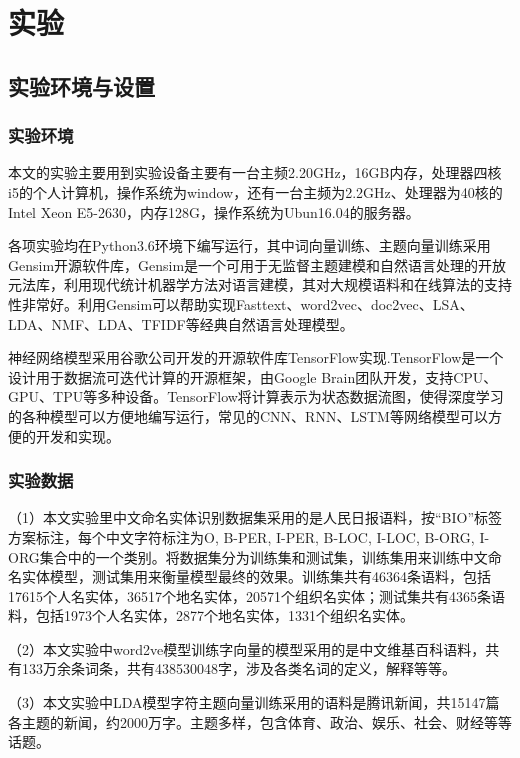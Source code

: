 \documentclass[winfonts,master,oneside,nobackinfo]{njuthesis}
\begin{document}
\section{实验}

\subsection{实验环境与设置}

\subsubsection{实验环境}

本文的实验主要用到实验设备主要有一台主频2.20GHz，16GB内存，处理器四核i5的个人计算机，操作系统为window，还有一台主频为2.2GHz、处理器为40核的Intel Xeon E5-2630，内存128G，操作系统为Ubun16.04的服务器。

各项实验均在Python3.6环境下编写运行，其中词向量训练、主题向量训练采用Gensim开源软件库，Gensim是一个可用于无监督主题建模和自然语言处理的开放元法库，利用现代统计机器学方法对语言建模，其对大规模语料和在线算法的支持性非常好。利用Gensim可以帮助实现Fasttext、word2vec、doc2vec、LSA、LDA、NMF、LDA、TFIDF等经典自然语言处理模型。

神经网络模型采用谷歌公司开发的开源软件库TensorFlow\cite{TensorFlow}实现.TensorFlow是一个设计用于数据流可迭代计算的开源框架，由Google Brain团队开发，支持CPU、GPU、TPU等多种设备。TensorFlow将计算表示为状态数据流图，使得深度学习的各种模型可以方便地编写运行，常见的CNN、RNN、LSTM等网络模型可以方便的开发和实现。

\subsubsection{实验数据}

（1）本文实验里中文命名实体识别数据集采用的是人民日报语料，按“BIO”标签方案标注，每个中文字符标注为{O, B-PER, I-PER, B-LOC, I-LOC, B-ORG, I-ORG}集合中的一个类别。将数据集分为训练集和测试集，训练集用来训练中文命名实体模型，测试集用来衡量模型最终的效果。训练集共有46364条语料，包括17615个人名实体，36517个地名实体，20571个组织名实体；测试集共有4365条语料，包括1973个人名实体，2877个地名实体，1331个组织名实体。

（2）本文实验中word2ve模型训练字向量的模型采用的是中文维基百科语料，共有133万余条词条，共有438530048字，涉及各类名词的定义，解释等等。

（3）本文实验中LDA模型字符主题向量训练采用的语料是腾讯新闻，共15147篇各主题的新闻，约2000万字。主题多样，包含体育、政治、娱乐、社会、财经等等话题。
\end{document}
